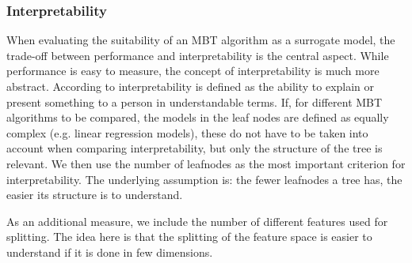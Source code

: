 \subsubsection{Interpretability}
When evaluating the suitability of an MBT algorithm as a surrogate model, the trade-off between performance and interpretability is the central aspect. While performance is easy to measure, the concept of interpretability is much more abstract.
According to \citet{DoshiVelez.2017} interpretability is defined as the ability to explain or present something to a person in understandable terms. If, for different MBT algorithms to be compared, the models in the leaf nodes are defined as equally complex (e.g. linear regression models), these do not have to be taken into account when comparing interpretability, but only the structure of the tree is relevant. We then use the number of leafnodes as the most important criterion for interpretability.  The underlying assumption is: the fewer leafnodes a tree has, the easier its structure is to understand.

As an additional measure, we include the number of different features used for splitting. The idea here is that the splitting of the feature space is easier to understand if it is done in few dimensions.



